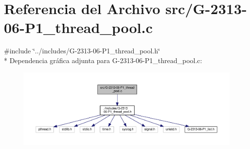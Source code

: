 \hypertarget{G-2313-06-P1__thread__pool_8c}{}\section{Referencia del Archivo src/\+G-\/2313-\/06-\/\+P1\+\_\+thread\+\_\+pool.c}
\label{G-2313-06-P1__thread__pool_8c}
{\ttfamily \#include \char`\"{}../includes/\+G-\/2313-\/06-\/\+P1\+\_\+thread\+\_\+pool.\+h\char`\"{}}\\*
Dependencia gráfica adjunta para G-\/2313-\/06-\/\+P1\+\_\+thread\+\_\+pool.c\+:\nopagebreak
\begin{figure}[H]
\begin{center}
\leavevmode
\includegraphics[width=350pt]{G-2313-06-P1__thread__pool_8c__incl}
\end{center}
\end{figure}
